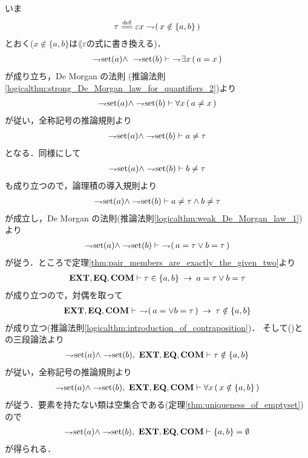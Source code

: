 	\begin{sketch}
		いま
		\begin{align}
			\tau \defeq \varepsilon x \negation (\, x \notin \{a,b\}\, )
		\end{align}
		とおく($x \notin \{a,b\}$は$\lang{\varepsilon}$の式に書き換える)．
		\begin{align}
			\rightharpoondown\hspace{-0.25em} \operatorname*{set} (a) \wedge\ \rightharpoondown\hspace{-0.25em} \operatorname*{set} (b)
			\vdash\ \rightharpoondown\hspace{-0.25em} \exists x\, (\, a = x\, )
		\end{align}
		が成り立ち，De Morgan の法則
		(推論法則\ref{logicalthm:strong_De_Morgan_law_for_quantifiers_2})より
		\begin{align}
			\rightharpoondown\hspace{-0.25em} \operatorname*{set} (a) \wedge \rightharpoondown\hspace{-0.25em} \operatorname*{set} (b)
			\vdash \forall x\, (\, a \neq x\, )
		\end{align}
		が従い，全称記号の推論規則より
		\begin{align}
			\rightharpoondown\hspace{-0.25em} \operatorname*{set} (a) \wedge \rightharpoondown\hspace{-0.25em} \operatorname*{set} (b) \vdash a \neq \tau
		\end{align}
		となる．同様にして
		\begin{align}
			\rightharpoondown\hspace{-0.25em} \operatorname*{set} (a) \wedge \rightharpoondown\hspace{-0.25em} \operatorname*{set} (b) \vdash b \neq \tau
		\end{align}
		も成り立つので，論理積の導入規則より
		\begin{align}
			\rightharpoondown\hspace{-0.25em} \operatorname*{set} (a) \wedge \rightharpoondown\hspace{-0.25em} \operatorname*{set} (b) \vdash
			a \neq \tau \wedge b \neq \tau
		\end{align}
		が成立し，De Morgan の法則(推論法則\ref{logicalthm:weak_De_Morgan_law_1})より
		\begin{align}
			\negation \set{a} \wedge \negation \set{b} \vdash\ 
			\negation (\, a = \tau \vee b = \tau\, )
			\label{fom:pair_of_proper_classes_is_emptyset_1}
		\end{align}
		が従う．ところで定理\ref{thm:pair_members_are_exactly_the_given_two}より
		\begin{align}
			\mbox{{\bf EXT}},\mbox{{\bf EQ}},\mbox{\bf COM} \vdash \tau \in \{a,b\} \hspace{0.25em}\rightarrow\hspace{0.25em} a = \tau \vee b = \tau
		\end{align}
		が成り立つので，対偶を取って
		\begin{align}
			\EXTAX,\EQAX,\COMAX \vdash\ 
			\negation (\, a = \vee b = \tau\, ) \rarrow \tau \notin \{a,b\}
		\end{align}
		が成り立つ(推論法則\ref{logicalthm:introduction_of_contraposition})．
		そして()との三段論法より
		\begin{align}
			\negation \set{a} \wedge \negation \set{b},\ \EXTAX,\EQAX,\COMAX \vdash
			\tau \notin \{a,b\}
		\end{align}
		が従い，全称記号の推論規則より
		\begin{align}
			\negation \set{a} \wedge \negation \set{b},\ \EXTAX,\EQAX,\COMAX \vdash
			\forall x\, (\, x \notin \{a,b\}\, )
		\end{align}
		が従う．要素を持たない類は空集合である(定理\ref{thm:uniqueness_of_emptyset})ので
		\begin{align}
			\negation \set{a} \wedge \negation \set{b},\ \EXTAX,\EQAX,\COMAX \vdash
			\{a,b\} = \emptyset
		\end{align}
		が得られる．
		\QED
	\end{sketch}
	
